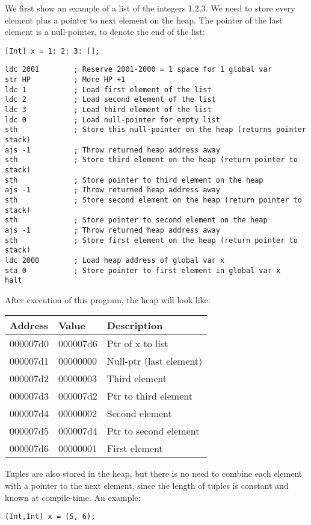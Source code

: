 \documentclass[a4paper]{article}
\begin{document}
We first show an example of a list of the integers 1,2,3. We need to store every element plus a pointer to next element on the heap. The pointer of the last element is a null-pointer, to denote the end of the list:
\begin{lstlisting}
[Int] x = 1: 2: 3: [];
\end{lstlisting}
\begin{lstlisting}
ldc 2001        ; Reserve 2001-2000 = 1 space for 1 global var
str HP          ; More HP +1
ldc 1           ; Load first element of the list
ldc 2           ; Load second element of the list
ldc 3           ; Load third element of the list
ldc 0           ; Load null-pointer for empty list
sth             ; Store this null-pointer on the heap (returns pointer stack)
ajs -1          ; Throw returned heap address away
sth             ; Store third element on the heap (return pointer to stack)
sth             ; Store pointer to third element on the heap
ajs -1          ; Throw returned heap address away
sth             ; Store second element on the heap (return pointer to stack)
sth             ; Store pointer to second element on the heap
ajs -1          ; Throw returned heap address away
sth             ; Store first element on the heap (return pointer to stack)
ldc 2000        ; Load heap address of global var x
sta 0           ; Store pointer to first element in global var x
halt
\end{lstlisting}
After execution of this program, the heap will look like:

\begin{tabular}{|l|l|l|}
        \hline
        Address & Value & Description \\
        \hline
        000007d0 & 000007d6 & Ptr of x to list \\
        000007d1 & 00000000 & Null-ptr (last element) \\
        000007d2 & 00000003 & Third element  \\
        000007d3 & 000007d2 & Ptr to third element  \\
        000007d4 & 00000002 & Second element  \\
        000007d5 & 000007d4 & Ptr to second element  \\
        000007d6 & 00000001 & First element  \\
        \hline
\end{tabular}

Tuples are also stored in the heap, but there is no need to combine each element with a pointer to the next element, since the length of tuples is constant and known at compile-time. An example:
\begin{lstlisting}
(Int,Int) x = (5, 6);
\end{lstlisting}
\end{document}
